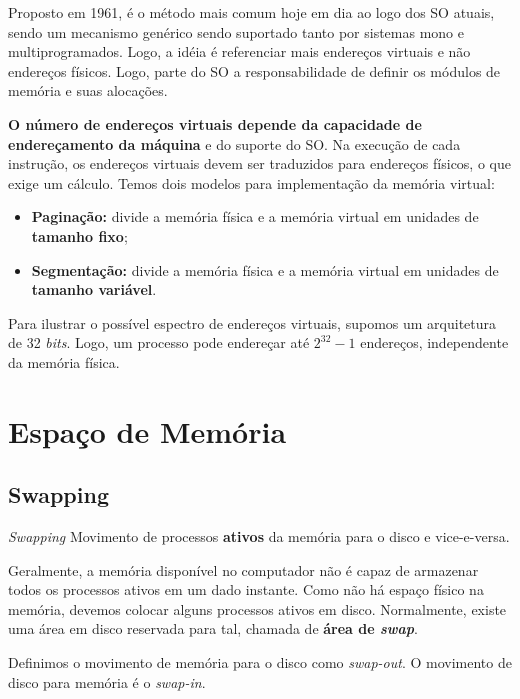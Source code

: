 Proposto em 1961, é o método mais comum hoje em dia ao logo dos SO atuais, sendo um mecanismo genérico sendo suportado tanto por sistemas mono e multiprogramados. Logo, a idéia é referenciar mais endereços virtuais e não endereços físicos. Logo, parte do SO a responsabilidade de definir os módulos de memória e suas alocações.

\textbf{O número de endereços virtuais depende da capacidade de endereçamento da máquina} e do suporte do SO. Na execução de cada instrução, os endereços virtuais devem ser traduzidos para endereços físicos, o que exige um cálculo. Temos dois modelos para implementação da memória virtual:

\begin{itemize}
  \item \textbf{Paginação:} divide a memória física e a memória virtual em unidades de \textbf{tamanho fixo};

  \item \textbf{Segmentação:} divide a memória física e a memória virtual em unidades de \textbf{tamanho variável}.
\end{itemize}

Para ilustrar o possível espectro de endereços virtuais, supomos um arquitetura de 32 \textit{bits}. Logo, um processo pode endereçar até $2^{32} - 1$ endereços, independente da memória física.





\section{Espaço de Memória}

\subsection{Swapping}
\begin{definicao}{\textit{Swapping}}
  Movimento de processos \textbf{ativos} da memória para o disco e vice-e-versa.
\end{definicao}

Geralmente, a memória disponível no computador não é capaz de armazenar todos os processos ativos em um dado instante. Como não há espaço físico na memória, devemos colocar alguns processos ativos em disco. Normalmente, existe uma área em disco reservada para tal, chamada de \textbf{área de \textit{swap}}.

Definimos o movimento de memória para o disco como \textit{swap-out}. O movimento de disco para memória é o \textit{swap-in}.



